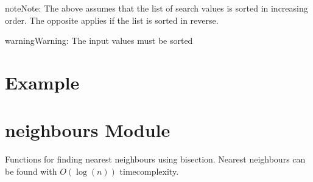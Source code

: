 \documentclass[letterpaper,10pt,english]{sphinxmanual}
\begin{document}
\begin{sphinxadmonition}{note}{Note:}
\sphinxAtStartPar
The above assumes that the list of search values is sorted in increasing order. The opposite applies if the
list is sorted in reverse.
\end{sphinxadmonition}

\begin{sphinxadmonition}{warning}{Warning:}
\sphinxAtStartPar
The input values must be sorted
\end{sphinxadmonition}


\section{Example}
\label{\detokenize{bisection:example}}
\begin{sphinxVerbatim}[commandchars=\\\{\}]
 

 \PYG{p}{[}\PYG{p}{]}  

   
   
   \PYG{p}{[}\PYG{p}{]}
\end{sphinxVerbatim}


\section{neighbours Module}
\label{\detokenize{bisection:module-GeoSpatialTools.neighbours}}\label{\detokenize{bisection:neighbours-module}}
\sphinxAtStartPar
Functions for finding nearest neighbours using bisection. Nearest neighbours can
be found with \(O(\log(n))\) time\sphinxhyphen{}complexity.
\end{document}
